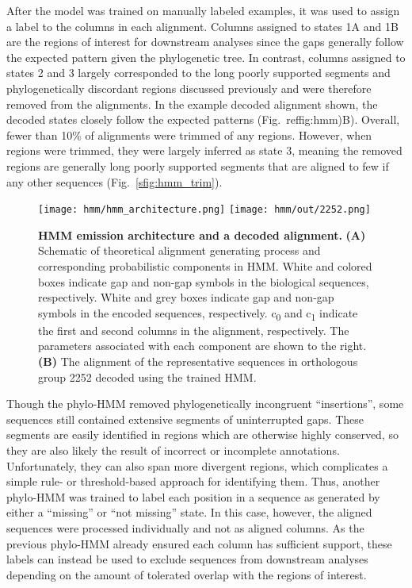 \documentclass[10pt,letterpaper]{article}
\begin{document}
After the model was trained on manually labeled examples, it was used to assign a label to the columns in each alignment. Columns assigned to states 1A and 1B are the regions of interest for downstream analyses since the gaps generally follow the expected pattern given the phylogenetic tree. In contrast, columns assigned to states 2 and 3 largely corresponded to the long poorly supported segments and phylogenetically discordant regions discussed previously and were therefore removed from the alignments. In the example decoded alignment shown, the decoded states closely follow the expected patterns (Fig.~ref{fig:hmm})B). Overall, fewer than 10\% of alignments were trimmed of any regions. However, when regions were trimmed, they were largely inferred as state 3, meaning the removed regions are generally long poorly supported segments that are aligned to few if any other sequences (Fig.~\ref{sfig:hmm_trim}).

\begin{figure}[h!]
\texttt{[image: hmm/hmm\_architecture.png]}
\texttt{[image: hmm/out/2252.png]}
\centering
\caption{\textbf{HMM emission architecture and a decoded alignment.}
\textbf{(A)} Schematic of theoretical alignment generating process and corresponding probabilistic components in HMM. White and colored boxes indicate gap and non-gap symbols in the biological sequences, respectively. White and grey boxes indicate gap and non-gap symbols in the encoded sequences, respectively. c\textsubscript{0} and c\textsubscript{1} indicate the first and second columns in the alignment, respectively. The parameters associated with each component are shown to the right. \textbf{(B)} The alignment of the representative sequences in orthologous group 2252 decoded using the trained HMM.}
\label{fig:hmm}
\end{figure}

Though the phylo-HMM removed phylogenetically incongruent ``insertions'', some sequences still contained extensive segments of uninterrupted gaps. These segments are easily identified in regions which are otherwise highly conserved, so they are also likely the result of incorrect or incomplete annotations. Unfortunately, they can also span more divergent regions, which complicates a simple rule- or threshold-based approach for identifying them. Thus, another phylo-HMM was trained to label each position in a sequence as generated by either a ``missing'' or ``not missing'' state. In this case, however, the aligned sequences were processed individually and not as aligned columns. As the previous phylo-HMM already ensured each column has sufficient support, these labels can instead be used to exclude sequences from downstream analyses depending on the amount of tolerated overlap with the regions of interest.
\end{document}
